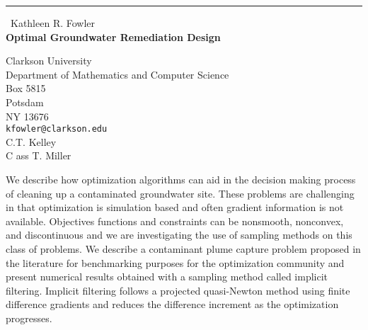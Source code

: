\documentclass{report}
\begin{document}
\begin{center}
\rule{6in}{1pt} \
{\large Kathleen R. Fowler \\
{\bf Optimal Groundwater Remediation Design}}

Clarkson University  \\ Department of Mathematics and Computer Science \\ Box 5815 \\ Potsdam \\ NY 13676
\\
{\tt kfowler@clarkson.edu}\\
C.T. Kelley\\
C ass T. Miller\end{center}

We describe how optimization algorithms can aid in the decision making
process of cleaning up a contaminated groundwater site. These problems
are challenging in that optimization is simulation based and often
gradient information is not available. Objectives functions and
constraints can be nonsmooth, nonconvex, and discontinuous and we are
investigating the use of sampling methods on this class of problems. We
describe a contaminant plume capture problem proposed in the literature
for benchmarking purposes for the optimization community and present
numerical results obtained with a sampling method called implicit
filtering. Implicit filtering follows a projected quasi-Newton method
using finite difference gradients and reduces the difference increment as
the optimization progresses.
\end{document}
